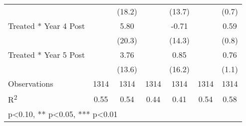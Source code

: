 \begin{table}[htbp]
\begin{tabular}{l*{6}{c}}
            &               &      (18.2)   &               &      (13.7)   &               &       (0.7)   \\
Treated * Year 4 Post&               &        5.80   &               &       -0.71   &               &        0.59   \\
            &               &      (20.3)   &               &      (14.3)   &               &       (0.8)   \\
Treated * Year 5 Post&               &        3.76   &               &        0.85   &               &        0.76   \\
            &               &      (13.6)   &               &      (16.2)   &               &       (1.1)   \\
\midrule
Observations&        1314   &        1314   &        1314   &        1314   &        1314   &        1314   \\
R\textsuperscript{2}&        0.55   &        0.54   &        0.44   &        0.41   &        0.54   &        0.58   \\
\bottomrule
\multicolumn{7}{l}{\footnotesize * p<0.10, ** p<0.05, *** p<0.01}\\
\end{tabular}
\end{table}
